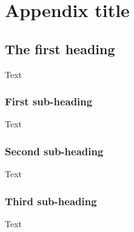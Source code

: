 \documentclass[10pt,oneside,english]{lips}
\begin{document}
\clearpage


\cleardoublepage
\appendix

\section{Appendix title}

\subsection{The first heading}
Text

\subsubsection{First sub-heading}
Text

\subsubsection{Second sub-heading}
Text

\subsubsection{Third sub-heading}
Text
\end{document}
